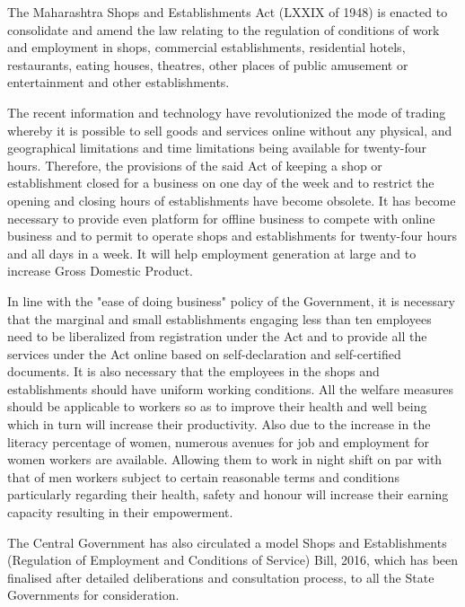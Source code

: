\documentclass[gaz8]{mhact}
\begin{document}
\begin{sor}
\item The Maharashtra Shops and Establishments Act (LXXIX of 1948) is
  enacted to consolidate and amend the law relating to the regulation
  of conditions of work and employment in shops, commercial
  establishments, residential hotels, restaurants, eating houses,
  theatres, other places of public amusement or entertainment and
  other establishments.

\item The recent information and technology have revolutionized the
  mode of trading whereby it is possible to sell goods and services
  online without any physical, and geographical limitations and time
  limitations being available for twenty-four hours. Therefore, the
  provisions of the said Act of keeping a shop or establishment closed
  for a business on one day of the week and to restrict the opening
  and closing hours of establishments have become obsolete.  It has
  become necessary to provide even platform for offline business to
  compete with online business and to permit to operate shops and
  establishments for twenty-four hours and all days in a week. It will
  help employment generation at large and to increase Gross Domestic
  Product.

\item In line with the "ease of doing business" policy of the
  Government, it is necessary that the marginal and small
  establishments engaging less than ten employees need to be
  liberalized from registration under the Act and to provide all the
  services under the Act online based on self-declaration and
  self-certified documents.  It is also necessary that the employees
  in the shops and establishments should have uniform working
  conditions. All the welfare measures should be applicable to workers
  so as to improve their health and well being which in turn will
  increase their productivity. Also due to the increase in the
  literacy percentage of women, numerous avenues for job and
  employment for women workers are available. Allowing them to work in
  night shift on par with that of men workers subject to certain
  reasonable terms and conditions particularly regarding their health,
  safety and honour will increase their earning capacity resulting in
  their empowerment.

\item The Central Government has also circulated a model Shops and
  Establishments (Regulation of Employment and Conditions of Service)
  Bill, 2016, which has been finalised after detailed deliberations
  and consultation process, to all the State Governments for
  consideration.


\end{sor}
\end{document}
